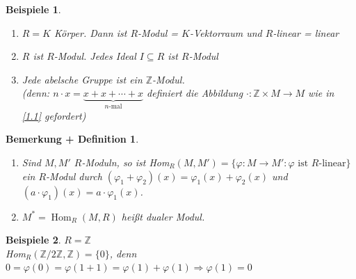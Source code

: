 \documentclass[a4paper,12pt]{scrbook}
\theoremstyle{break}
\newtheorem{BemDef}[Def]{Bemerkung + Definition}
\theoremstyle{nonumberbreak}
\newtheorem{nnBsp}{Beispiele}
\theoremstyle{nonumberplain}
\DeclareMathOperator{\Hom}{Hom}
\begin{document}
\begin{nnBsp}
  \begin{enumerate}
    \item[(1)] $R = K$ Körper. Dann ist $R$-Modul = $K$-Vektorraum und
               $R$-linear = linear
    \item[(2)] $R$ ist $R$-Modul. Jedes Ideal $I \subseteq R$ ist $R$-Modul
    \item[(3)] Jede abelsche Gruppe ist ein $\mathbb{Z}$-Modul.\\
               (denn: $n \cdot x = \underbrace{x + x + \cdots + x}_{n\text{-mal}}$
               definiert die Abbildung $\cdot: \mathbb{Z} \times M \to M$
               wie in \ref{1.1} gefordert)
  \end{enumerate}
\end{nnBsp}

\begin{BemDef}
  \begin{enumerate}
    \item Sind $M,M'$ $R$-Moduln, so ist Hom$_R(M,M') = \{\varphi: M \to M' :
          \varphi \text{ ist } R\text{-linear}\}$ ein $R$-Modul durch
          $(\varphi_1 + \varphi_2)(x) = \varphi_1(x) + \varphi_2(x)$ und
          $(a \cdot \varphi_1)(x) = a \cdot \varphi_1(x)$.
    \item $M^* = \Hom_R(M,R)$ heißt dualer Modul.
  \end{enumerate}
\end{BemDef}

\newcommand{\BIGOP}[1]{\mathop{\mathchoice%
{\raise-0.22em\hbox{\huge $#1$}}%
{\raise-0.05em\hbox{\Large $#1$}}{\hbox{\large $#1$}}{#1}}}
\newcommand{\bigtimes}{\BIGOP{\times}} 

\begin{nnBsp}
  $R = \mathbb{Z}$\\
  Hom$_R(\mathbb{Z}/2\mathbb{Z}, \mathbb{Z}) = \{ 0 \}$, denn $0 = \varphi(0) =
  \varphi(1 + 1) = \varphi(1)+\varphi(1) \Rightarrow \varphi(1) = 0$
\end{nnBsp}
\end{document}
